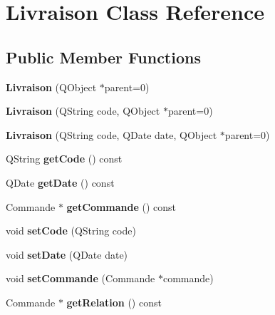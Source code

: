 \hypertarget{class_livraison}{
\section{Livraison Class Reference}
\label{d4/d22/class_livraison}
}
\subsection*{Public Member Functions}
\begin{DoxyCompactItemize}
\item 
\hypertarget{class_livraison_a7d0434db6895a5c160450268979f6445}{
{\bfseries Livraison} (QObject $\ast$parent=0)}
\label{d4/d22/class_livraison_a7d0434db6895a5c160450268979f6445}

\item 
\hypertarget{class_livraison_ad9c960946be0da63ba538505a182f957}{
{\bfseries Livraison} (QString code, QObject $\ast$parent=0)}
\label{d4/d22/class_livraison_ad9c960946be0da63ba538505a182f957}

\item 
\hypertarget{class_livraison_aab0f1710bec755837986685a7931f0c4}{
{\bfseries Livraison} (QString code, QDate date, QObject $\ast$parent=0)}
\label{d4/d22/class_livraison_aab0f1710bec755837986685a7931f0c4}

\item 
\hypertarget{class_livraison_ac45873bb957ef8d5e889900219896723}{
QString {\bfseries getCode} () const }
\label{d4/d22/class_livraison_ac45873bb957ef8d5e889900219896723}

\item 
\hypertarget{class_livraison_a410732dc51aae0c4e3cf5451ca46cc2c}{
QDate {\bfseries getDate} () const }
\label{d4/d22/class_livraison_a410732dc51aae0c4e3cf5451ca46cc2c}

\item 
\hypertarget{class_livraison_acec633d570add8bbbed748813b78cc6d}{
Commande $\ast$ {\bfseries getCommande} () const }
\label{d4/d22/class_livraison_acec633d570add8bbbed748813b78cc6d}

\item 
\hypertarget{class_livraison_a2ac000fbaf9779d2d661a2cb291a6346}{
void {\bfseries setCode} (QString code)}
\label{d4/d22/class_livraison_a2ac000fbaf9779d2d661a2cb291a6346}

\item 
\hypertarget{class_livraison_a97b2860e0a932cad26bce0919cad84a7}{
void {\bfseries setDate} (QDate date)}
\label{d4/d22/class_livraison_a97b2860e0a932cad26bce0919cad84a7}

\item 
\hypertarget{class_livraison_a083935cbe0de82f77ce44b0ee2a114b4}{
void {\bfseries setCommande} (Commande $\ast$commande)}
\label{d4/d22/class_livraison_a083935cbe0de82f77ce44b0ee2a114b4}

\item 
\hypertarget{class_livraison_a63578ea3b8a259a385914705a0d26459}{
Commande $\ast$ {\bfseries getRelation} () const }
\label{d4/d22/class_livraison_a63578ea3b8a259a385914705a0d26459}

\end{DoxyCompactItemize}
